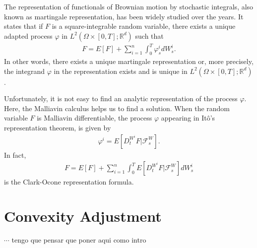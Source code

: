 \documentclass[a4paper,10pt]{article}
\newcommand{\1}{\mathbf{1}}
\begin{document}
\medbreak

The representation of functionals of Brownian motion by stochastic integrals, also known as martingale representation, has been widely studied over the years. It states that if $F$ is a square-integrable random variable, there exists a unique adapted process $\varphi$ in $L^{2}(\Omega \times \left[0,T\right]; \mathbb{R}^{d})$ such that
\begin{eqnarray*}
F=E\left[F\right] + \sum^{n}_{i=1}\int^{T}_{0} \varphi^{i}_{s} dW^{i}_{s}.
\end{eqnarray*}
In other words, there exists a unique martingale representation or, more precisely, the integrand $\varphi$ in the representation exists and is unique in $L^{2}(\Omega \times \left[0,T\right]; \mathbb{R}^{d})$.

\medbreak

Unfortunately, it is not easy to find an analytic representation of the process $\varphi$. Here, the Malliavin calculus helps us to find a solution. When the random variable $F$ is Malliavin differentiable, the process $\varphi$ appearing in It\^o's representation theorem, is given by
\begin{eqnarray*}
\varphi^{i}=E\left[D^{W^{i}}_{t}F|\mathcal{F}^{W}_{s}\right].
\end{eqnarray*}
In fact,
\begin{eqnarray}\label{clark-okone}
F=E\left[F\right] + \sum^{n}_{i=1}\int^{T}_{0} E\left[D^{W^{i}}_{t}F|\mathcal{F}^{W}_{s}\right] dW^{i}_{s}
\end{eqnarray}
is the Clark-Ocone representation formula. 

 

\section{Convexity Adjustment}\label{sec:CA}
$\cdots$  tengo que pensar que poner aqui como intro
\end{document}
